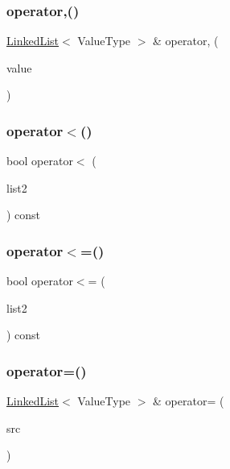 \subsubsection{\texorpdfstring{operator,()}{operator,()}}
{\footnotesize\ttfamily \mbox{\hyperlink{classLinkedList}{Linked\+List}}$<$ Value\+Type $>$ \& operator, (\begin{DoxyParamCaption}\item[{const Value\+Type \&}]{value }\end{DoxyParamCaption})}

\mbox{\label{classLinkedList_a1622208b00e2ffcf2ad120c1d748c784}} 
\subsubsection{\texorpdfstring{operator$<$()}{operator<()}}
{\footnotesize\ttfamily bool operator$<$ (\begin{DoxyParamCaption}\item[{const \mbox{\hyperlink{classLinkedList}{Linked\+List}}$<$ Value\+Type $>$ \&}]{list2 }\end{DoxyParamCaption}) const}

\mbox{\label{classLinkedList_ac25ce8222d0af74f8052d4106ec83cd0}} 
\subsubsection{\texorpdfstring{operator$<$=()}{operator<=()}}
{\footnotesize\ttfamily bool operator$<$= (\begin{DoxyParamCaption}\item[{const \mbox{\hyperlink{classLinkedList}{Linked\+List}}$<$ Value\+Type $>$ \&}]{list2 }\end{DoxyParamCaption}) const}

\mbox{\label{classLinkedList_a8ba73804c2f6409d0f7fac8ab07caa75}} 
\subsubsection{\texorpdfstring{operator=()}{operator=()}}
{\footnotesize\ttfamily \mbox{\hyperlink{classLinkedList}{Linked\+List}}$<$ Value\+Type $>$ \& operator= (\begin{DoxyParamCaption}\item[{const \mbox{\hyperlink{classLinkedList}{Linked\+List}}$<$ Value\+Type $>$ \&}]{src }\end{DoxyParamCaption})}

